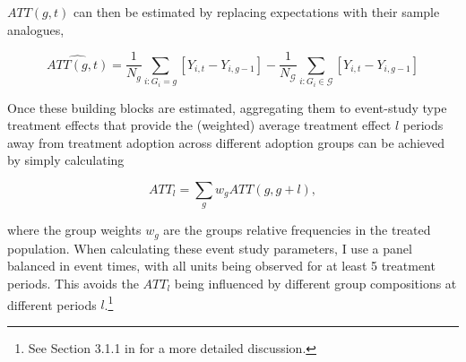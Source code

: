$ATT(g,t)$ can then be estimated by replacing expectations with their sample
analogues,

\begin{equation}
    \widehat{ATT(g,t)} = \frac{1}{N_g}\sum_{i:G_i=g}[Y_{i,t} - Y_{i, g-1}] -
    \frac{1}{N_\mathcal{G}}\sum_{i:G_i \in \mathcal{G}}[Y_{i,t} - Y_{i, g-1}]
\end{equation}

Once these building blocks are estimated, aggregating them to event-study type treatment effects that provide the (weighted)
average treatment effect $l$ periods away from treatment adoption across
different adoption groups can be achieved by simply calculating

\begin{equation}
    ATT_l = \sum_g w_g ATT(g,g+l),
\end{equation}

where the group weights $w_g$ are the groups relative frequencies in the
treated population. When calculating these event study parameters, I use a
panel balanced in event times, with all units being observed for at least 5
treatment periods. This avoids the $ATT_l$ being influenced by different
group compositions at different periods $l$.\footnote{See Section 3.1.1 in
\citet{callaway2021difference} for a more detailed discussion.}



